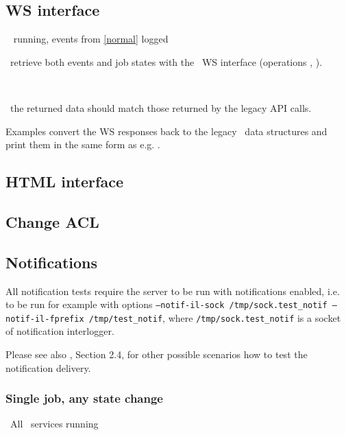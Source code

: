 \subsection{WS interface}
\req\  running, events from \ref{normal} logged

\what\ retrieve both events and job states with the \LB\ WS interface
(operations , ).

\how\ 

\result\ the returned data should match those returned by the legacy
API calls.

\begin{hints}
Examples  convert the WS
responses back to the legacy \LB\ data structures and print them in
the same form as e.g. .
\end{hints}



\subsection{HTML interface}



\subsection{Change ACL}




\subsection{Notifications}

All notification tests require the \LB server to be run with notifications enabled,
i.e. to be run for example with options 
\texttt{--notif-il-sock /tmp/sock.test\_notif --notif-il-fprefix /tmp/test\_notif}, 
where \texttt{/tmp/sock.test\_notif} is a socket of notification interlogger.

Please see also \cite{lbug}, Section 2.4, for other possible scenarios how to test the notification delivery.


\subsubsection{Single job, any state change}
\label{notif1}
\req\ All \LB\ services running

